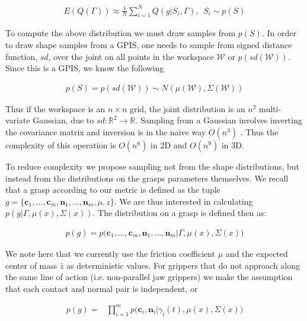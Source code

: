 \documentclass[letterpaper, 10 pt, conference]{ieeeconf}  %
\begin{document}
\begin{align*}
E(Q(\Gamma)) \approx \frac{1}{N} \sum_{i=1}^N Q(g|S_i,\Gamma) , \ \  S_i \sim p(S)
\end{align*}

To compute the above distribution we must draw samples from $p(S)$. In order to draw shape samples from a GPIS, one needs to sample from signed distance function, $sd$, over the joint on all points in the workspace $\mathcal{W}$ or $p(sd(\mathcal{W}))$. Since this is a GPIS, we know the following 

\begin{align}\label{eq:joint_shape}
p(S) = p(sd(\mathcal{W})) \sim N(\mu(\mathcal{W}),\Sigma(\mathcal{W}))
\end{align}

Thus if the workspace is an $n \times n$ grid, the joint distribution is an  $n^2$ multi-variate Gaussian, due to $sd:\mathbb{R}^2 \rightarrow \mathbb{R}$.  Sampling from a Gaussian involves inverting the covariance matrix and inversion is in the naive way $O(n^3)$ \cite{petersen2008matrix}. Thus the complexity of this operation is $O(n^6)$ in 2D and $O(n^9)$ in 3D. 

To reduce complexity we propose sampling not from the shape distributions, but instead from the distributions on the grasps parameters themselves. We recall that a grasp according to our metric is defined as the tuple $g = \lbrace \textbf{c}_1,...,\textbf{c}_m,\textbf{n}_1,...,\textbf{n}_m,\mu, z \rbrace$. We are thus interested in calculating $p(g|\Gamma,\mu(x),\Sigma(x))$. The distribution on a grasp is defined then as: 

\begin{align}\label{eq:joint_on_shape}
p(g) = p\big(\textbf{c}_1,...,\textbf{c}_m,\textbf{n}_1,...,\textbf{n}_m|\Gamma,\mu(x),\Sigma(x)\big)
\end{align}

We note here that we currently use the friction coefficient $\mu$ and the expected center of mass $\bar{z}$ as deterministic values. For grippers that do not approach along the same line of action (i.e. non-parallel jaw grippers) we make the assumption that each contact and normal pair is independent, or 

\vspace{-2ex}
\begin{align}\label{eq:independence}
p(g) = &\prod_{i=1}^mp\big(\textbf{c}_i,\textbf{n}_i|\gamma_i(t),\mu(x),\Sigma(x)\big)
\end{align}
\end{document}
